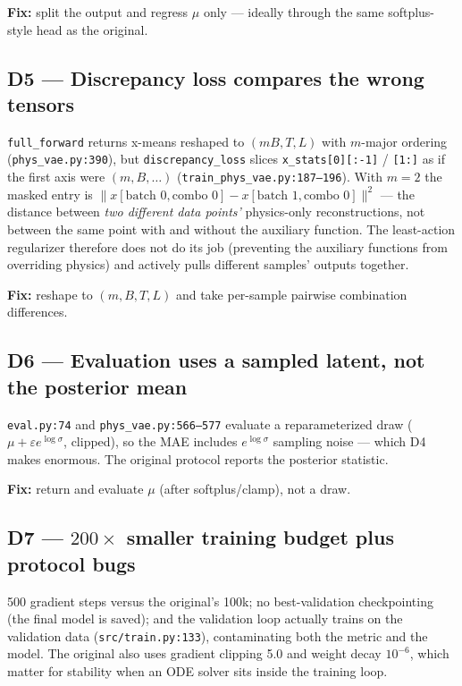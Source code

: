 \documentclass[11pt,a4paper]{article}
\newcommand{\code}[1]{\texttt{#1}}
\begin{document}
\textbf{Fix:} split the output and regress $\mu$ only --- ideally through the same
softplus-style head as the original.

\subsection*{D5 --- Discrepancy loss compares the wrong tensors}

\code{full\_forward} returns x-means reshaped to $(mB, T, L)$ with $m$-major ordering
(\code{phys\_vae.py:390}), but \code{discrepancy\_loss} slices
\code{x\_stats[0][:-1]} / \code{[1:]} as if the first axis were $(m, B, \dots)$
(\code{train\_phys\_vae.py:187--196}). With $m = 2$ the masked entry is
$\|x[\text{batch }0,\text{combo }0] - x[\text{batch }1,\text{combo }0]\|^2$ ---
the distance between \emph{two different data points'} physics-only reconstructions,
not between the same point with and without the auxiliary function. The least-action
regularizer therefore does not do its job (preventing the auxiliary functions from
overriding physics) and actively pulls different samples' outputs together.

\textbf{Fix:} reshape to $(m, B, T, L)$ and take per-sample pairwise combination
differences.

\subsection*{D6 --- Evaluation uses a sampled latent, not the posterior mean}

\code{eval.py:74} and \code{phys\_vae.py:566--577} evaluate a reparameterized draw
($\mu + \varepsilon e^{\log\sigma}$, clipped), so the MAE includes $e^{\log\sigma}$
sampling noise --- which D4 makes enormous. The original protocol reports the
posterior statistic.

\textbf{Fix:} return and evaluate $\mu$ (after softplus/clamp), not a draw.

\subsection*{D7 --- $200\times$ smaller training budget plus protocol bugs}

500 gradient steps versus the original's 100k; no best-validation checkpointing (the
final model is saved); and the validation loop actually trains on the validation data
(\code{src/train.py:133}), contaminating both the metric and the model. The original
also uses gradient clipping 5.0 and weight decay $10^{-6}$, which matter for stability
when an ODE solver sits inside the training loop.
\end{document}
